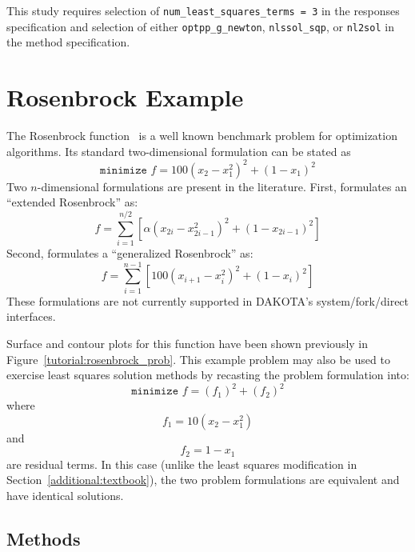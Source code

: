 This study requires selection of \texttt{num\_least\_squares\_terms = 3} 
in the responses specification and selection of either 
\texttt{optpp\_g\_newton}, \texttt{nlssol\_sqp}, or \texttt{nl2sol} in 
the method specification.

\section{Rosenbrock Example}\label{additional:rosenbrock}

The Rosenbrock function~\cite{Gil81} is a well known benchmark problem
for optimization algorithms. Its standard two-dimensional formulation
can be stated as
\begin{equation}
\texttt{minimize } f=100(x_2-x_1^2)^2+(1-x_1)^2 \label{additional:rosenstd}
\end{equation}
Two $n$-dimensional formulations are present in the literature.
First, \cite{Noc99} formulates an ``extended Rosenbrock'' as:
\begin{equation}
f = \sum_{i=1}^{n/2} \left[ \alpha (x_{2i}-x_{2i-1}^2)^2+(1-x_{2i-1})^2 \right]
\label{additional:rosenexd}
\end{equation}
Second, \cite{Sch87} formulates a ``generalized Rosenbrock'' as:
\begin{equation}
f = \sum_{i=1}^{n-1} \left[ 100 (x_{i+1}-x_i^2)^2+(1-x_i)^2 \right]
\label{additional:rosengen}
\end{equation}
These formulations are not currently supported in DAKOTA's
system/fork/direct interfaces.

Surface and contour plots for this function have been shown previously
in Figure~\ref{tutorial:rosenbrock_prob}. This example problem
may also be used to exercise least squares solution methods by
recasting the problem formulation into:
\begin{equation}
\texttt{minimize } f = (f_1)^2+(f_2)^2 \label{additional:rosenls}
\end{equation}
where
\begin{equation}
f_1 = 10 (x_2 - x_1^2) \label{additional:rosenr1}
\end{equation}
and
\begin{equation}
f_2 = 1 - x_1 \label{additional:rosenr2}
\end{equation}
are residual terms. In this case (unlike the least squares
modification in Section~\ref{additional:textbook}), the two problem
formulations are equivalent and have identical solutions.

\subsection{Methods}\label{additional:rosenbrock:methods}

